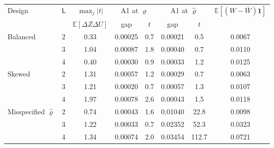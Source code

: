 \begin{tabular}{llcccccc}
\toprule
Design & $\mathsf L$ & $\max_j|t|$ & \multicolumn{2}{c}{A1 at $\varrho$} & \multicolumn{2}{c}{A1 at $\hat\varrho$} & $\mathbb{E}[(W-\bar W)\mathbf 1]$ \\
\cmidrule(lr){4-5}\cmidrule(lr){6-7}
 & & $\mathbb{E}[\Delta Z\Delta U]$ & gap & $t$ & gap & $t$ & \\
\midrule
Balanced & 2 & 0.33 & 0.00025 & 0.7 & 0.00021 & 0.5 & 0.0067 \\
 & 3 & 1.04 & 0.00087 & 1.8 & 0.00040 & 0.7 & 0.0110 \\
 & 4 & 0.40 & 0.00030 & 0.9 & 0.00033 & 1.2 & 0.0125 \\
\addlinespace
Skewed & 2 & 1.31 & 0.00057 & 1.2 & 0.00029 & 0.7 & 0.0063 \\
 & 3 & 1.21 & 0.00020 & 0.7 & 0.00057 & 1.3 & 0.0107 \\
 & 4 & 1.97 & 0.00078 & 2.6 & 0.00043 & 1.5 & 0.0118 \\
\addlinespace
Misspecified $\hat\varrho$ & 2 & 0.74 & 0.00043 & 1.6 & 0.01040 & 22.8 & 0.0098 \\
 & 3 & 1.22 & 0.00033 & 0.7 & 0.02352 & 52.3 & 0.0323 \\
 & 4 & 1.34 & 0.00074 & 2.0 & 0.03454 & 112.7 & 0.0721 \\
\bottomrule
\end{tabular}
